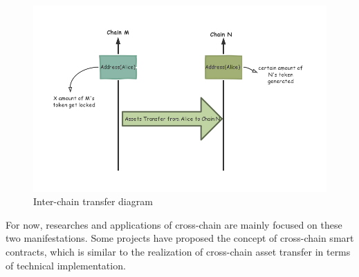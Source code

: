 \begin{enumerate}
    
    \begin{figure}[H]
    \includegraphics[width=1\textwidth]{./figures/transfer.png}
    \centering
    \caption{Inter-chain transfer diagram}%
    \centering
    \label{fig:transfer}
    \end{figure}
\end{enumerate}


\noindent For now, researches and applications of cross-chain are mainly focused on these two manifestations. Some projects have proposed the concept of cross-chain smart contracts, which is similar to the realization of cross-chain asset transfer in terms of technical implementation.


